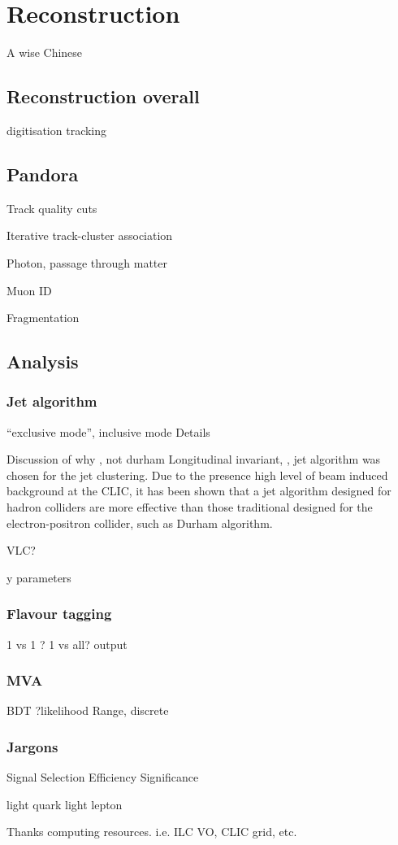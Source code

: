 \chapter{Reconstruction}
\label{chap:Reconstruction}

%
{A wise Chinese}%


\section{Reconstruction overall}
digitisation
tracking

\section{Pandora}

Track quality cuts

Iterative track-cluster association

Photon, passage through matter

Muon ID

Fragmentation

\section{Analysis}

\subsection{Jet algorithm}

``exclusive mode'', inclusive mode
Details

Discussion of why \kt, not durham
Longitudinal invariant, \kt, jet algorithm was chosen for the jet clustering. Due to the presence high level of beam induced background at the CLIC, it has been shown that a jet algorithm designed for hadron colliders are more effective than those traditional designed for the electron-positron collider, such as Durham algorithm.\cite{}

VLC?


y parameters
\subsection{Flavour tagging}

1 vs 1 ? 1 vs all?
output

\subsection{MVA}

BDT
?likelihood
Range, discrete
\subsection{Jargons}
Signal
Selection
Efficiency
Significance

\qlight light quark
light lepton

Thanks computing resources. i.e. ILC VO, CLIC grid, etc. 
